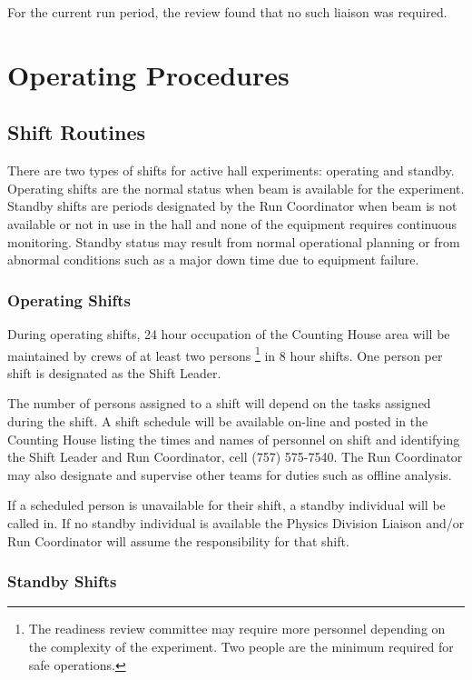 \documentclass[11pt]{article}
\begin{document}
For the current run period, the review found that no such liaison was required. 

\section{Operating Procedures}

\subsection{Shift Routines}
\indent

There are two types of shifts for active hall experiments:
operating and standby. Operating shifts are the normal status
when beam is available for the experiment. Standby shifts are periods 
designated by the Run Coordinator when beam is not available or not in
use in the hall and none of the equipment requires
continuous monitoring. Standby status may result from normal operational
planning or from abnormal conditions such as a major down time due to
equipment failure.


\subsubsection{Operating Shifts}
\indent

During operating shifts, 24 hour occupation of the Counting House area will 
be maintained by crews of at least two persons
\footnote{\label{fn2}The readiness review committee may require more 
personnel depending on the complexity of the experiment. Two people are 
the minimum required for safe operations.} 
in 8 hour shifts. One person per shift is designated as the Shift Leader.

The number of persons assigned to a shift will depend on the tasks assigned 
during the shift. A shift schedule will be available on-line and posted in the Counting House 
listing the times and names of personnel on shift and identifying the 
Shift Leader and Run Coordinator, cell (757) 575-7540. The Run Coordinator may also designate 
and supervise other teams for duties such as offline analysis.

If a scheduled person is unavailable for their shift, a standby individual will be called in.
If no standby individual is available the Physics Division Liaison and/or Run Coordinator will assume the responsibility for that shift.

\subsubsection{Standby Shifts}
\indent
\end{document}
